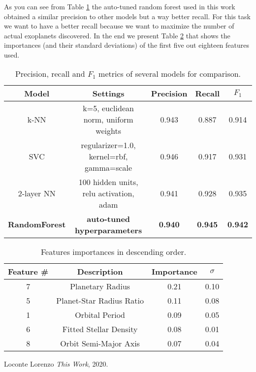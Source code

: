 \documentclass[11pt, a4paper]{article}
\begin{document}
\begin{multicols}{2}
  As you can see from Table \ref{table:benchmark} the auto-tuned random forest used in this work obtained a similar precision to other models but a way better recall. For this task we want to have a better recall because we want to maximize the number of actual exoplanets discovered.
  In the end we present Table \ref{table:importances} that shows the importances (and their standard deviations) of the first five out eighteen features used.
\end{multicols}

  \begin{table}
    \centering
    \begin{tabular}{|c c c c c|}
      \hline
      Model & Settings & Precision & Recall & $F_{1}$  \\
      \hline\hline
      k-NN & k=5, euclidean norm, uniform weights & 0.943 & 0.887 & 0.914 \\
      \hline
      SVC & regularizer=1.0, kernel=rbf, gamma=scale & 0.946 & 0.917 & 0.931 \\
      \hline
      2-layer NN & 100 hidden units, relu activation, adam & 0.941 & 0.928 & 0.935 \\
      \hline
      \textbf{RandomForest} & \textbf{auto-tuned hyperparameters} & \textbf{0.940} & \textbf{0.945} & \textbf{0.942} \\
      \hline
    \end{tabular}
    \caption{Precision, recall and $F_{1}$ metrics of several models for comparison.}
    \label{table:benchmark}
  \end{table}

  \begin{table}
    \centering
    \begin{tabular}{|c c c c|}
    \hline
    Feature \# & Description & Importance & $\sigma$ \\
    \hline\hline
    7 & Planetary Radius & 0.21 & 0.10 \\
    5 & Planet-Star Radius Ratio & 0.11 & 0.08 \\
    1 & Orbital Period & 0.09 & 0.05 \\
    6 & Fitted Stellar Density & 0.08 & 0.01 \\
    8 & Orbit Semi-Major Axis & 0.07 & 0.04 \\
    \hline
    \end{tabular}
    \caption{Features importances in descending order.}
    \label{table:importances}
  \end{table}

\newpage
\begin{thebibliography}{9}
    Loconte Lorenzo
    \textit{This Work}, 2020.
\end{thebibliography}
\end{document}
